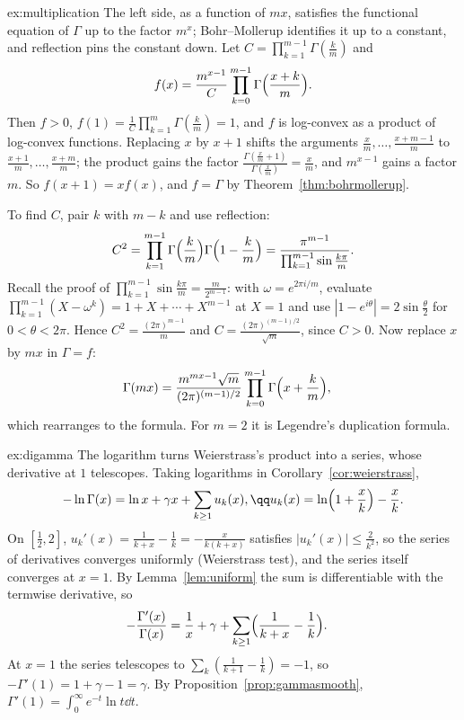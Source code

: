 \begin{solution}{ex:multiplication}
\idea The left side, as a function of $mx$, satisfies the functional equation of $\Gamma$ up to the factor $m^x$; Bohr--Mollerup
identifies it up to a constant, and reflection pins the constant down.
\writeup Let $C=\prod_{k=1}^{m-1}\Gamma(\frac km)$ and
\[
f(x)=\frac{m^{x-1}}C\prod_{k=0}^{m-1}\Gamma\Bigl(\frac{x+k}m\Bigr).
\]
Then $f>0$, $f(1)=\frac1C\prod_{k=1}^m\Gamma(\frac km)=1$, and
$f$ is log-convex as a product of log-convex functions. Replacing $x$ by $x+1$ shifts the arguments $\frac xm,\dots,\frac{x+m-1}m$ to
$\frac{x+1}m,\dots,\frac{x+m}m$; the product gains the factor $\frac{\Gamma(\frac xm+1)}{\Gamma(\frac xm)}=\frac xm$, and $m^{x-1}$ gains a factor $m$. So
$f(x+1)=xf(x)$, and $f=\Gamma$ by Theorem~\ref{thm:bohrmollerup}.

To find $C$, pair $k$ with $m-k$ and use reflection:
\[
C^2=\prod_{k=1}^{m-1}\Gamma\Bigl(\frac km\Bigr)\Gamma\Bigl(1-\frac km\Bigr)=\frac{\pi^{m-1}}{\prod_{k=1}^{m-1}\sin\frac{k\pi}m}.
\]
Recall the proof of $\prod_{k=1}^{m-1}\sin\frac{k\pi}m=\frac m{2^{m-1}}$: with $\omega=e^{2\pi i/m}$, evaluate $\prod_{k=1}^{m-1}(X-\omega^k)=1+X+\cdots+X^{m-1}$ at
$X=1$ and use $|1-e^{i\theta}|=2\sin\frac\theta2$ for $0<\theta<2\pi$. Hence $C^2=\frac{(2\pi)^{m-1}}m$ and $C=\frac{(2\pi)^{(m-1)/2}}{\sqrt m}$, since $C>0$. Now replace $x$
by $mx$ in $\Gamma=f$:
\[
\begin{aligned}\Gamma(mx)&=\frac{m^{mx-1}\sqrt m}{(2\pi)^{(m-1)/2}}\prod_{k=0}^{m-1}\Gamma\Bigl(x+\frac km\Bigr),\end{aligned}
\]
which rearranges to the formula. For $m=2$ it is Legendre's duplication formula.
\end{solution}

\begin{solution}{ex:digamma}
\idea The logarithm turns Weierstrass's product into a series, whose derivative at $1$ telescopes.
\writeup Taking logarithms in Corollary~\ref{cor:weierstrass},
\[
\begin{gathered}-\ln\Gamma(x)=\ln x+\gamma x+\sum_{k\ge1}u_k(x),\qq u_k(x)=\ln\Bigl(1+\frac xk\Bigr)-\frac xk.\end{gathered}
\]
On $[\frac12,2]$, $u_k'(x)=\frac1{k+x}-\frac1k=-\frac x{k(k+x)}$ satisfies $|u_k'(x)|\le\frac2{k^2}$, so the series of derivatives converges uniformly
(Weierstrass test), and the series itself converges at $x=1$. By Lemma~\ref{lem:uniform} the sum is differentiable with the
termwise derivative, so
\[
\begin{aligned}-\frac{\Gamma'(x)}{\Gamma(x)}&=\frac1x+\gamma+\sum_{k\ge1}\Bigl(\frac1{k+x}-\frac1k\Bigr).\end{aligned}
\]
At $x=1$ the series telescopes to $\sum_k(\frac1{k+1}-\frac1k)=-1$, so $-\Gamma'(1)=1+\gamma-1=\gamma$. By
Proposition~\ref{prop:gammasmooth}, $\Gamma'(1)=\int_0^\infty e^{-t}\ln t\dd t$.
\end{solution}

